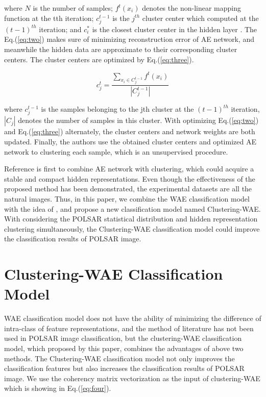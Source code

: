 \documentclass[11pt, a4paper, onecolumn, oneside]{article}
\begin{document}
where $N$ is the number of samples; $f^t(x_i)$ denotes the non-linear mapping function at the tth iteration; $c_j^{t-1}$ is the $j^{th}$ cluster center which computed at the $(t−1)^{th}$ iteration; and $c_i^*$ is the closest cluster center in the hidden layer \cite{u, v}. The Eq.(\ref{eq:two}) makes sure of minimizing reconstruction error of AE network, and meanwhile the hidden data are approximate to their corresponding cluster centers. The cluster centers are optimized by Eq.(\ref{eq:three}).

\begin{equation} \label{eq:three}
c_{j}^{t} = \frac {{\sum \nolimits _{x_{i} \in C_{j}^{t - 1}} {f^{t}\left ({ {x_{i}} }\right )} }}{{\left |{ {C_{j}^{t - 1}} }\right |}}
\end{equation} 

where $c_j^{t-1}$ is the samples belonging to the jth cluster at the $(t−1)^{th}$ iteration, $|C_j|$ denotes the number of samples in this cluster. With optimizing Eq.(\ref{eq:two}) and Eq.(\ref{eq:three}) alternately, the cluster centers and network weights are both updated. Finally, the authors use the obtained cluster centers and optimized AE network to clustering each sample, which is an unsupervised procedure.

Reference \cite{u} is first to combine AE network with clustering, which could acquire a stable and compact hidden representations. Even though the effectiveness of the proposed method has been demonstrated, the experimental datasets are all the natural images. Thus, in this paper, we combine the WAE classification model with the idea of \cite{u}, and propose a new classification model named Clustering-WAE. With considering the POLSAR statistical distribution and hidden representation clustering simultaneously, the Clustering-WAE classification model could improve the classification results of POLSAR image.

\section{Clustering-WAE Classification Model} \label{sec:three}

WAE classification model does not have the ability of minimizing the difference of intra-class of feature representations, and the method of literature \cite{u} has not been used in POLSAR image classification, but the clustering-WAE classification model, which proposed by this paper, combines the advantages of above two methods. The Clustering-WAE classification model not only improves the classification features but also increases the classification results of POLSAR image. We use the coherency matrix vectorization as the input of clustering-WAE which is showing in Eq.(\ref{eq:four}).
\end{document}
